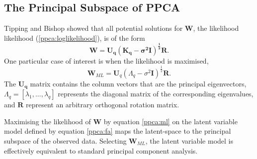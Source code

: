 \documentclass[ %
                    author={Dillon Keith Diep},
                supervisor={Dr. Carl Henrik Ek},
                    degree={MEng},
                     title={Assisted Content Generation for 3D Hair Geometry},
                  subtitle={[INCOMPLETE DRAFT, NOT FOR SUBMISSION]},
                      type={Research},
                      year={2014} ]{dissertation}
\begin{document}
\subsection{The Principal Subspace of PPCA}
Tipping and Bishop\cite{ppca} showed that all potential solutions for $\mathbf{W}$, the likelihood likelihood (\ref{ppca:loglikelihood}), is of the form $$\mathbf{W=U_q(K_q-\sigma^2I)^\frac{1}{2}R}.$$
One particular case of interest is when the likelihood is maximised,
\begin{equation} \label{ppca:ml}
	\mathbf{W}_{ML}=\mathbf{U}_q(\Lambda_q-\sigma^2\mathbf{I})^{\frac{1}{2}}\mathbf{R}.
\end{equation}
The $\mathbf{U_q}$ matrix contains the column vectors that are the principal eigenvectors, $\Lambda_q=[\lambda_1,...,\lambda_q]$ represents the diagonal matrix of the corresponding eigenvalues, and $\mathbf{R}$ represent an arbitrary orthogonal rotation matrix. 

Maximising the likelihood of $\mathbf{W}$ by equation \ref{ppca:ml} on the latent variable model defined by equation \ref{ppca:fa} maps the latent-space to the principal subspace of the observed data. Selecting $\mathbf{W}_{ML}$, the latent variable model is effectively equivalent to standard principal component analysis.
\end{document}

